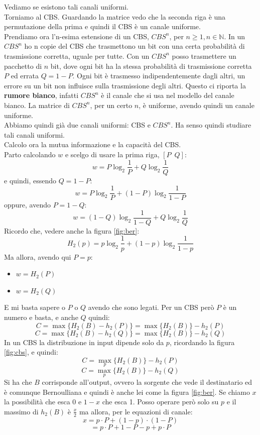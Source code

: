 \documentclass[a4paper,12pt, oneside]{book}
\begin{document}
Vediamo se esistono tali canali uniformi.\\
Torniamo al CBS. Guardando la matrice vedo che la seconda riga è una
permutazione della prima e quindi il CBS è un canale uniforme.\\
Prendiamo ora l'n-esima estensione di un CBS, $CBS^n$, per $n\geq 1,
n\in\mathbb{N}$. In un $CBS^n$ ho n copie del CBS che trasmettono un bit con una
certa probabilità di trasmissione corretta, uguale per tutte. Con un $CBS^n$
posso trasmettere un pacchetto di $n$ bit, dove ogni bit ha la stessa
probabilità di trasmissione corretta $P$ ed errata $Q=1-P$. Ogni bit è
trasmesso indipendentemente dagli altri, un errore su un bit non influisce sulla
trasmissione degli altri. Questo ci riporta la \textbf{rumore bianco}, infatti
$CBS^n$ è il canale che si usa nel modello del canale bianco. La matrice di
$CBS^n$, per un certo $n$, è uniforme, avendo quindi un canale uniforme.\\
Abbiamo quindi già due canali uniformi: CBS e $CBS^n$. Ha senso quindi studiare
tali canali uniformi.\\
Calcolo ora la mutua informazione e la capacità del CBS.\\
Parto calcolando $w$ e scelgo di usare la prima riga, $[P\,\,\,Q]$:
\[w=P\log_2\frac{1}{P}+Q\log_2\frac{1}{Q}\]
e quindi, essendo $Q=1-P$:
\[w=P\log_2\frac{1}{P}+(1-P)\log_2\frac{1}{1-P}\]
oppure, avendo $P=1-Q$:
\[w=(1-Q)\log_2\frac{1}{1-Q}+Q\log_2\frac{1}{Q}\]
Ricordo che, vedere anche la figura \ref{fig:ber}:
\[H_2(p)=p\log_2\frac{1}{p}+(1-p)\log_2\frac{1}{1-p}\]
Ma allora, avendo qui $P=p$:
\begin{itemize}
  \item $w=H_2(P)$
  \item $w=H_2(Q)$
\end{itemize}
E mi basta sapere o $P$ o $Q$ avendo che sono legati. Per un CBS però $P$ è un
numero e basta, e anche $Q$ quindi:
\[C=\max \{H_2(B)-h_2(P)\}=\max \{H_2(B)\}-h_2(P)\]
\[C=\max \{H_2(B)-h_2(Q)\}=\max \{H_2(B)\}-h_2(Q)\]
In un CBS la distribuzione in input dipende solo da $p$, ricordando la figura
\ref{fig:cbs}, e quindi: 
\[C=\max_p \{H_2(B)\}-h_2(P)\]
\[C=\max_p \{H_2(B)\}-h_2(Q)\]
Si ha che $B$ corrisponde all'output, ovvero la sorgente che vede il
destinatario ed è comunque Bernoulliana e quindi è anche lei come la figura
\ref{fig:ber}. Se chiamo $x$ la possibilità che esca 0 e $1-x$ che esca 1. Posso
operare però solo su $p$ e il massimo di $h_2(B)$ è $\frac{x}{2}$ ma allora, per
le equazioni di canale:
\[x=p\cdot P+(1-p)\cdot (1-P)\]
\[=p\cdot P+1-P-p+p\cdot P\]
\end{document}
